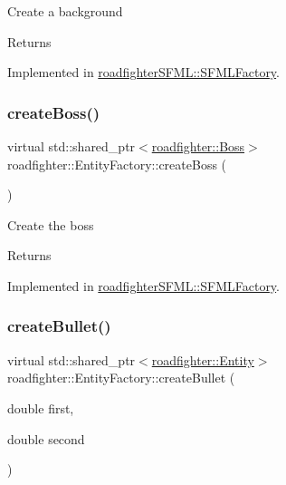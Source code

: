 Create a background \begin{DoxyReturn}{Returns}

\end{DoxyReturn}


Implemented in \hyperlink{classroadfighterSFML_1_1SFMLFactory_a18a78a7113edf49647f727105329f605}{roadfighter\+S\+F\+M\+L\+::\+S\+F\+M\+L\+Factory}.

\mbox{\label{classroadfighter_1_1EntityFactory_ae7a09423660432e744ed35f5f04b0931}} 
\subsubsection{\texorpdfstring{create\+Boss()}{createBoss()}}
{\footnotesize\ttfamily virtual std\+::shared\+\_\+ptr$<$\hyperlink{classroadfighter_1_1Boss}{roadfighter\+::\+Boss}$>$ roadfighter\+::\+Entity\+Factory\+::create\+Boss (\begin{DoxyParamCaption}{ }\end{DoxyParamCaption})\hspace{0.3cm}{\ttfamily [pure virtual]}}

Create the boss \begin{DoxyReturn}{Returns}

\end{DoxyReturn}


Implemented in \hyperlink{classroadfighterSFML_1_1SFMLFactory_a86f4fed282eebc1556ed1134e7ad7e13}{roadfighter\+S\+F\+M\+L\+::\+S\+F\+M\+L\+Factory}.

\mbox{\label{classroadfighter_1_1EntityFactory_a2d4319aef20024f83e7c3189e92c89e1}} 
\subsubsection{\texorpdfstring{create\+Bullet()}{createBullet()}}
{\footnotesize\ttfamily virtual std\+::shared\+\_\+ptr$<$\hyperlink{classroadfighter_1_1Entity}{roadfighter\+::\+Entity}$>$ roadfighter\+::\+Entity\+Factory\+::create\+Bullet (\begin{DoxyParamCaption}\item[{double}]{first,  }\item[{double}]{second }\end{DoxyParamCaption})\hspace{0.3cm}{\ttfamily [pure virtual]}}

